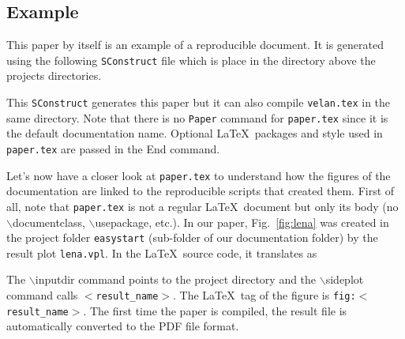 \begin{comment}
A Madagascar reproducible paper is a paper written in \LaTeX\ and
whose figures are either generated by Madagascar reproducible scripts
or available for download, e.g.  this paper!  (\texttt{paper.tex}
available in the \texttt{rsf/scons/} directory of Madagascar book
section).

The main SConstruct command set in our reproducible research
environment and related to documentation is

This command is defined in \texttt{\$RSFROOT/lib/rsftex.py}.
\end{comment}

\subsection{Example}

This paper by itself is an example of a reproducible document. It is
generated using the following \texttt{SConstruct} file which is place
in the directory above the projects directories.



This \texttt{SConstruct} generates this paper but it can also compile
\texttt{velan.tex} in the same directory. Note that there is no
\texttt{Paper} command for \texttt{paper.tex} since it is the default
documentation name. Optional \LaTeX\ packages and style used in
\texttt{paper.tex} are passed in the End command.

Let's now have a closer look at \texttt{paper.tex} to understand how
the figures of the documentation are linked to the reproducible
scripts that created them. First of all, note that \texttt{paper.tex}
is not a regular \LaTeX\ document but only its body (no
$\backslash$documentclass, $\backslash$usepackage, etc.). In our
paper, Fig.~\ref{fig:lena} was created in the project folder
\texttt{easystart} (sub-folder of our documentation folder) by the
result plot \texttt{lena.vpl}. In the \LaTeX\ source code, it
translates as\\



The $\backslash$inputdir command points to the project directory and
the $\backslash$sideplot command calls \texttt{$<$result\_name$>$}. The
\LaTeX\ tag of the figure is \texttt{fig:$<$result\_name$>$}. The
first time the paper is compiled, the result file is automatically
converted to the PDF file format. 

